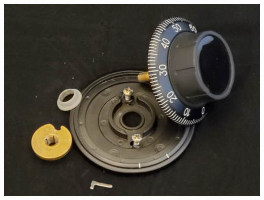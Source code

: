\documentclass[11pt, letterpaper]{article}
\begin{document}
\begin{center}
  \includegraphics[scale=.075]{dialAssem}
\end{center}
\end{document}
